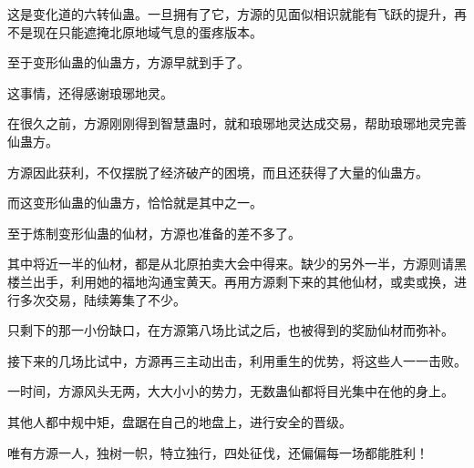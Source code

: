 \begin{this_body}
这是变化道的六转仙蛊。一旦拥有了它，方源的见面似相识就能有飞跃的提升，再不是现在只能遮掩北原地域气息的蛋疼版本。

至于变形仙蛊的仙蛊方，方源早就到手了。

这事情，还得感谢琅琊地灵。

在很久之前，方源刚刚得到智慧蛊时，就和琅琊地灵达成交易，帮助琅琊地灵完善仙蛊方。

方源因此获利，不仅摆脱了经济破产的困境，而且还获得了大量的仙蛊方。

而这变形仙蛊的仙蛊方，恰恰就是其中之一。

至于炼制变形仙蛊的仙材，方源也准备的差不多了。

其中将近一半的仙材，都是从北原拍卖大会中得来。缺少的另外一半，方源则请黑楼兰出手，利用她的福地沟通宝黄天。再用方源剩下来的其他仙材，或卖或换，进行多次交易，陆续筹集了不少。

只剩下的那一小份缺口，在方源第八场比试之后，也被得到的奖励仙材而弥补。

接下来的几场比试中，方源再三主动出击，利用重生的优势，将这些人一一击败。

一时间，方源风头无两，大大小小的势力，无数蛊仙都将目光集中在他的身上。

其他人都中规中矩，盘踞在自己的地盘上，进行安全的晋级。

唯有方源一人，独树一帜，特立独行，四处征伐，还偏偏每一场都能胜利！

\end{this_body}

